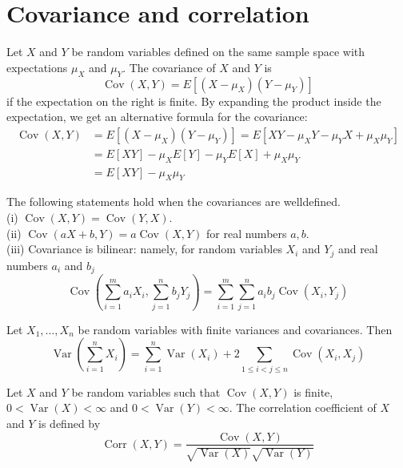 \documentclass[11pt]{elegantbook}
\begin{document}
\section{Covariance and correlation}
\begin{definition}
Let $X$ and $Y$ be random variables defined on the same sample space with expectations $\mu_X$ and $\mu_Y$. The covariance of $X$ and $Y$ is
$$
\operatorname{Cov}(X, Y)=E\left[\left(X-\mu_X\right)\left(Y-\mu_Y\right)\right]
$$
if the expectation on the right is finite.
By expanding the product inside the expectation, we get an alternative formula for the covariance:
$$
\begin{aligned}
\operatorname{Cov}(X, Y) & =E\left[\left(X-\mu_X\right)\left(Y-\mu_Y\right)\right]=E\left[X Y-\mu_X Y-\mu_Y X+\mu_X \mu_Y\right] \\
& =E[X Y]-\mu_X E[Y]-\mu_Y E[X]+\mu_X \mu_Y \\
& =E[X Y]-\mu_X \mu_Y
\end{aligned}
$$
\end{definition}
\begin{proposition}
 The following statements hold when the covariances are welldefined.\\
(i) $\operatorname{Cov}(X, Y)=\operatorname{Cov}(Y, X)$.\\
(ii) $\operatorname{Cov}(a X+b, Y)=a \operatorname{Cov}(X, Y)$ for real numbers $a, b$.\\
(iii) Covariance is bilinear: namely, for random variables $X_i$ and $Y_j$ and real numbers $a_i$ and $b_j$
$$
\operatorname{Cov}\left(\sum_{i=1}^m a_i X_i, \sum_{j=1}^n b_j Y_j\right)=\sum_{i=1}^m \sum_{j=1}^n a_i b_j \operatorname{Cov}\left(X_i, Y_j\right)
$$
\end{proposition}
\begin{theorem}
 Let $X_1, \ldots, X_n$ be random variables with finite variances and covariances. Then
$$
\operatorname{Var}\left(\sum_{i=1}^n X_i\right)=\sum_{i=1}^n \operatorname{Var}\left(X_i\right)+2 \sum_{1 \leq i<j \leq n} \operatorname{Cov}\left(X_i, X_j\right)
$$
\end{theorem}
\begin{definition}
Let $X$ and $Y$ be random variables such that $\operatorname{Cov}(X, Y)$ is finite, $0<\operatorname{Var}(X)<\infty$ and $0<\operatorname{Var}(Y)<\infty$. The correlation coefficient of $X$ and $Y$ is defined by
$$
\operatorname{Corr}(X, Y)=\frac{\operatorname{Cov}(X, Y)}{\sqrt{\operatorname{Var}(X)} \sqrt{\operatorname{Var}(Y)}}
$$
\end{definition}
\end{document}
